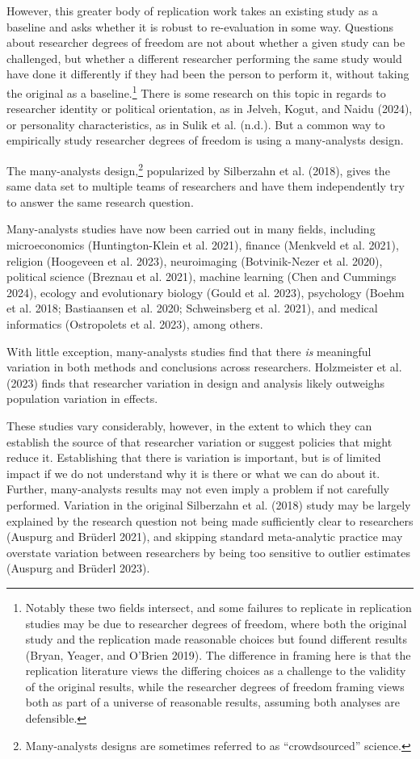\documentclass[
  letterpaper,
  DIV=11,
  numbers=noendperiod]{scrartcl}
\begin{document}
However, this greater body of replication work takes an existing study
as a baseline and asks whether it is robust to re-evaluation in some
way. Questions about researcher degrees of freedom are not about whether
a given study can be challenged, but whether a different researcher
performing the same study would have done it differently if they had
been the person to perform it, without taking the original as a
baseline.\footnote{Notably these two fields intersect, and some failures
  to replicate in replication studies may be due to researcher degrees
  of freedom, where both the original study and the replication made
  reasonable choices but found different results (Bryan, Yeager, and
  O'Brien 2019). The difference in framing here is that the replication
  literature views the differing choices as a challenge to the validity
  of the original results, while the researcher degrees of freedom
  framing views both as part of a universe of reasonable results,
  assuming both analyses are defensible.} There is some research on this
topic in regards to researcher identity or political orientation, as in
Jelveh, Kogut, and Naidu (2024), or personality characteristics, as in
Sulik et al. (n.d.). But a common way to empirically study researcher
degrees of freedom is using a many-analysts design.

The many-analysts design,\footnote{Many-analysts designs are sometimes
  referred to as ``crowdsourced'' science.} popularized by Silberzahn et
al. (2018), gives the same data set to multiple teams of researchers and
have them independently try to answer the same research question.

Many-analysts studies have now been carried out in many fields,
including microeconomics (Huntington-Klein et al. 2021), finance
(Menkveld et al. 2021), religion (Hoogeveen et al. 2023), neuroimaging
(Botvinik-Nezer et al. 2020), political science (Breznau et al. 2021),
machine learning (Chen and Cummings 2024), ecology and evolutionary
biology (Gould et al. 2023), psychology (Boehm et al. 2018; Bastiaansen
et al. 2020; Schweinsberg et al. 2021), and medical informatics
(Ostropolets et al. 2023), among others.

With little exception, many-analysts studies find that there \emph{is}
meaningful variation in both methods and conclusions across researchers.
Holzmeister et al. (2023) finds that researcher variation in design and
analysis likely outweighs population variation in effects.

These studies vary considerably, however, in the extent to which they
can establish the source of that researcher variation or suggest
policies that might reduce it. Establishing that there is variation is
important, but is of limited impact if we do not understand why it is
there or what we can do about it. Further, many-analysts results may not
even imply a problem if not carefully performed. Variation in the
original Silberzahn et al. (2018) study may be largely explained by the
research question not being made sufficiently clear to researchers
(Auspurg and Brüderl 2021), and skipping standard meta-analytic practice
may overstate variation between researchers by being too sensitive to
outlier estimates (Auspurg and Brüderl 2023).
\end{document}
